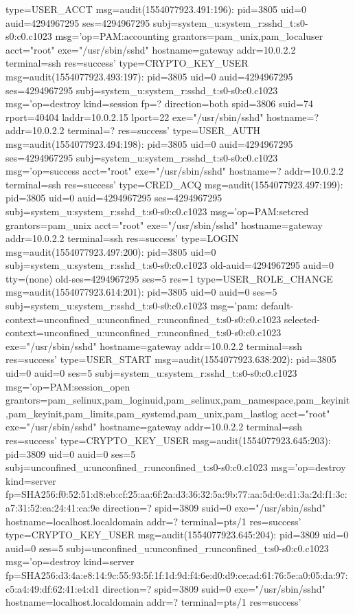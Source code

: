 \documentclass[]{report}
\newenvironment{Shaded}{}{}
\newcommand{\NormalTok}[1]{#1}
\begin{document}
\begin{Shaded}
\begin{Highlighting}[]
\NormalTok{type=USER_ACCT msg=audit(1554077923.491:196): pid=3805 uid=0 auid=4294967295 ses=4294967295 subj=system_u:system_r:sshd_t:s0-s0:c0.c1023 msg='op=PAM:accounting grantors=pam_unix,pam_localuser acct="root" exe="/usr/sbin/sshd" hostname=gateway addr=10.0.2.2 terminal=ssh res=success'}
\NormalTok{type=CRYPTO_KEY_USER msg=audit(1554077923.493:197): pid=3805 uid=0 auid=4294967295 ses=4294967295 subj=system_u:system_r:sshd_t:s0-s0:c0.c1023 msg='op=destroy kind=session fp=? direction=both spid=3806 suid=74 rport=40404 laddr=10.0.2.15 lport=22  exe="/usr/sbin/sshd" hostname=? addr=10.0.2.2 terminal=? res=success'}
\NormalTok{type=USER_AUTH msg=audit(1554077923.494:198): pid=3805 uid=0 auid=4294967295 ses=4294967295 subj=system_u:system_r:sshd_t:s0-s0:c0.c1023 msg='op=success acct="root" exe="/usr/sbin/sshd" hostname=? addr=10.0.2.2 terminal=ssh res=success'}
\NormalTok{type=CRED_ACQ msg=audit(1554077923.497:199): pid=3805 uid=0 auid=4294967295 ses=4294967295 subj=system_u:system_r:sshd_t:s0-s0:c0.c1023 msg='op=PAM:setcred grantors=pam_unix acct="root" exe="/usr/sbin/sshd" hostname=gateway addr=10.0.2.2 terminal=ssh res=success'}
\NormalTok{type=LOGIN msg=audit(1554077923.497:200): pid=3805 uid=0 subj=system_u:system_r:sshd_t:s0-s0:c0.c1023 old-auid=4294967295 auid=0 tty=(none) old-ses=4294967295 ses=5 res=1}
\NormalTok{type=USER_ROLE_CHANGE msg=audit(1554077923.614:201): pid=3805 uid=0 auid=0 ses=5 subj=system_u:system_r:sshd_t:s0-s0:c0.c1023 msg='pam: default-context=unconfined_u:unconfined_r:unconfined_t:s0-s0:c0.c1023 selected-context=unconfined_u:unconfined_r:unconfined_t:s0-s0:c0.c1023 exe="/usr/sbin/sshd" hostname=gateway addr=10.0.2.2 terminal=ssh res=success'}
\NormalTok{type=USER_START msg=audit(1554077923.638:202): pid=3805 uid=0 auid=0 ses=5 subj=system_u:system_r:sshd_t:s0-s0:c0.c1023 msg='op=PAM:session_open grantors=pam_selinux,pam_loginuid,pam_selinux,pam_namespace,pam_keyinit,pam_keyinit,pam_limits,pam_systemd,pam_unix,pam_lastlog acct="root" exe="/usr/sbin/sshd" hostname=gateway addr=10.0.2.2 terminal=ssh res=success'}
\NormalTok{type=CRYPTO_KEY_USER msg=audit(1554077923.645:203): pid=3809 uid=0 auid=0 ses=5 subj=unconfined_u:unconfined_r:unconfined_t:s0-s0:c0.c1023 msg='op=destroy kind=server fp=SHA256:f0:52:51:d8:eb:cf:25:aa:6f:2a:d3:36:32:5a:9b:77:aa:5d:0e:d1:3a:2d:f1:3c:a7:31:52:ea:24:41:ca:9e direction=? spid=3809 suid=0  exe="/usr/sbin/sshd" hostname=localhost.localdomain addr=? terminal=pts/1 res=success'}
\NormalTok{type=CRYPTO_KEY_USER msg=audit(1554077923.645:204): pid=3809 uid=0 auid=0 ses=5 subj=unconfined_u:unconfined_r:unconfined_t:s0-s0:c0.c1023 msg='op=destroy kind=server fp=SHA256:d3:4a:e8:14:9c:55:93:5f:1f:1d:9d:f4:6e:d0:d9:ce:ad:61:76:5e:a0:05:da:97:c5:a4:49:df:62:41:e4:d1 direction=? spid=3809 suid=0  exe="/usr/sbin/sshd" hostname=localhost.localdomain addr=? terminal=pts/1 res=success'}

\end{Highlighting}
\end{Shaded}
\end{document}
